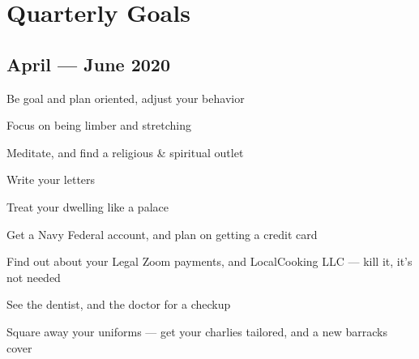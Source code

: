 \chapter{Quarterly Goals}

\section{April --- June 2020}

\begin{todolist}
\item Be goal and plan oriented, adjust your behavior
\item Focus on being limber and stretching
\item Meditate, and find a religious \& spiritual outlet
\item Write your letters
\item Treat your dwelling like a palace
\item Get a Navy Federal account, and plan on getting a credit card
\item Find out about your Legal Zoom payments, and LocalCooking LLC --- kill it, it's not needed
\item See the dentist, and the doctor for a checkup
\item Square away your uniforms --- get your charlies tailored, and a new barracks cover
\end{todolist}
